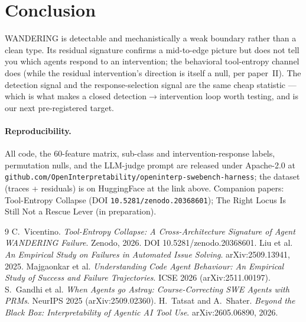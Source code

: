 \documentclass[11pt]{article}
\begin{document}
\section{Conclusion}

WANDERING is detectable and mechanistically a weak boundary rather than a clean type. Its residual signature confirms a mid-to-edge picture but does not tell you which agents respond to an intervention; the behavioral tool-entropy channel does (while the residual intervention's direction is itself a null, per paper~II). The detection signal and the response-selection signal are the same cheap statistic --- which is what makes a closed detection$\to$intervention loop worth testing, and is our next pre-registered target.

\paragraph{Reproducibility.} All code, the 60-feature matrix, sub-class and intervention-response labels, permutation nulls, and the LLM-judge prompt are released under Apache-2.0 at \texttt{github.com/OpenInterpretability/openinterp-swebench-harness}; the dataset (traces + residuals) is on HuggingFace at the link above. Companion papers: Tool-Entropy Collapse (DOI \texttt{10.5281/zenodo.20368601}); The Right Locus Is Still Not a Rescue Lever (in preparation).

\begin{thebibliography}{9}
 C.\ Vicentino. \emph{Tool-Entropy Collapse: A Cross-Architecture Signature of Agent WANDERING Failure}. Zenodo, 2026. DOI 10.5281/zenodo.20368601.
 Liu et al. \emph{An Empirical Study on Failures in Automated Issue Solving}. arXiv:2509.13941, 2025.
 Majgaonkar et al. \emph{Understanding Code Agent Behaviour: An Empirical Study of Success and Failure Trajectories}. ICSE 2026 (arXiv:2511.00197).
 S.\ Gandhi et al. \emph{When Agents go Astray: Course-Correcting SWE Agents with PRMs}. NeurIPS 2025 (arXiv:2509.02360).
 H.\ Tatsat and A.\ Shater. \emph{Beyond the Black Box: Interpretability of Agentic AI Tool Use}. arXiv:2605.06890, 2026.
\end{thebibliography}
\end{document}
